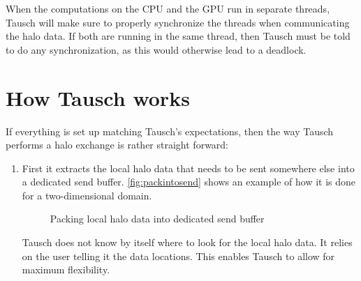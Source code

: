 \documentclass{article}
\begin{document}
When the computations on the CPU and the GPU run in separate threads, Tausch will make sure to properly synchronize the threads when communicating the halo data. If both are running in the same thread, then Tausch must be told to do any synchronization, as this would otherwise lead to a deadlock.

\section{How Tausch works}\label{sec:howtauschworks}

If everything is set up matching Tausch's expectations, then the way Tausch performs a halo exchange is rather straight forward:

\begin{enumerate}
    \item First it extracts the local halo data that needs to be sent somewhere else into a dedicated send buffer. \autoref{fig:packintosend} shows an example of how it is done for a two-dimensional domain.
        \begin{figure}[ht]\centering
            \caption{Packing local halo data into dedicated send buffer \label{fig:packintosend}}
        \end{figure}

        Tausch does not know by itself where to look for the local halo data. It relies on the user telling it the data locations. This enables Tausch to allow for maximum flexibility.


\end{enumerate}
\end{document}
